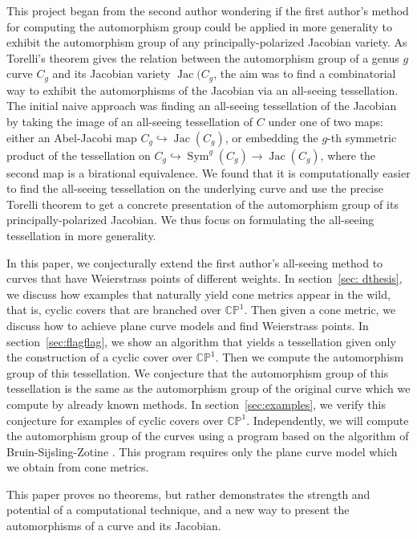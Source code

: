 \documentclass[12pt,reqno]{amsart}
\DeclareMathOperator{\Jac}{Jac}
\DeclareMathOperator{\Sym}{Sym}
\theoremstyle{definition}
\theoremstyle{remark}
\begin{document}
This project began from the second author wondering if the first author's method for computing the automorphism group could be applied in more generality to exhibit the automorphism group of any principally-polarized Jacobian variety. As Torelli's theorem gives the relation between the automorphism group of a genus $g$ curve $C_g$ and its Jacobian variety $\Jac(C_g$, the aim was to find a combinatorial way to exhibit the automorphisms of the Jacobian via an all-seeing tessellation. The initial naive approach was finding an all-seeing tessellation of the Jacobian by taking the image of an all-seeing tessellation of $C$ under one of two maps: either an Abel-Jacobi map $C_g \hookrightarrow \Jac(C_g)$, or embedding the $g$-th symmetric product of the tessellation on $C_g \hookrightarrow \Sym^g(C_g) \to \Jac(C_g)$, where the second map is a birational equivalence. We found that it is computationally easier to find the all-seeing tessellation on the underlying curve and use the precise Torelli theorem to get a concrete presentation of the automorphism group of its principally-polarized Jacobian. We thus focus on formulating the all-seeing tessellation in more generality.

In this paper, we conjecturally extend the first author's all-seeing method to curves that have Weierstrass points of different weights. In section~\ref{sec: dthesis}, we discuss how examples that naturally yield cone metrics appear in the wild, that is, cyclic covers that are branched over $\mathbb{C}\mathbb{P}^1.$ Then given a cone metric, we discuss how to achieve plane curve models and find Weierstrass points. In section~\ref{sec:flagflag}, we show an algorithm that yields a tessellation given only the construction of a cyclic cover over $\mathbb{C}\mathbb{P}^1.$ Then we compute the automorphism group of this tessellation. We conjecture that the automorphism group of this tessellation is the same as the automorphism group of the original curve which we compute by already known methods. In section~\ref{sec:examples}, we verify this conjecture for examples of cyclic covers over $\mathbb{C}\mathbb{P}^1.$ Independently, we will compute the automorphism group of the curves using a program based on the algorithm of Bruin-Sijsling-Zotine \cite{jeroen}. This program requires only the plane curve model which we obtain from cone metrics. 

This paper proves no theorems, but rather demonstrates the strength and potential of a computational technique, and a new way to present the automorphisms of a curve and its Jacobian.
\end{document}
